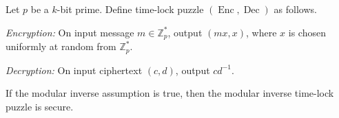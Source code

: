 \documentclass{article}
\newcommand{\Enc}{\operatorname{Enc}}
\newcommand{\Dec}{\operatorname{Dec}}
\newcommand{\Zp}{\mathbb{Z}^*_p}
\begin{document}

\begin{protocol}
  Let $p$ be a $k$-bit prime.
  Define time-lock puzzle $(\Enc, \Dec)$ as follows.

  \emph{Encryption:} On input message $m \in \Zp$, output $(mx, x)$, where $x$ is chosen uniformly at random from $\Zp$.

  \emph{Decryption:} On input ciphertext $(c, d)$, output $cd^{-1}$.
\end{protocol}

\begin{conjecture}
  If the modular inverse assumption is true, then the modular inverse time-lock puzzle is secure.
\end{conjecture}


\end{document}
